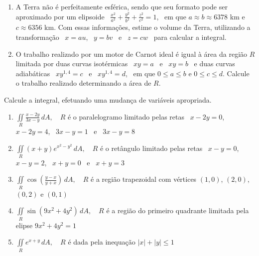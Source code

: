 \documentclass[a4paper, 12pt]{article}
\begin{document}
	\begin{enumerate}[resume]
		
		\item A Terra não é perfeitamente esférica, sendo que seu formato pode ser aproximado por um elipsoide \, $\displaystyle \frac{x^2}{a^2} + \frac{y^2}{b^2} + \frac{z^2}{c^2} = 1$, \, em que $a \approx b \approx 6378$ km e $c \approx 6356$ km. Com essas informações, estime o volume da Terra, utilizando a transformação \, $x = au$, \, $ y = bv$ \, e \, $z = cw$ \, para calcular a integral.
		
		\item O trabalho realizado por um motor de Carnot ideal é igual à área da região $R$ limitada por duas curvas isotérmicas \, $xy = a$ \, e \, $xy = b$ \, e duas curvas adiabáticas \, $xy^{1,4} = c$ \, e \, $xy^{1,4} = d$, \, em que $0 \leq a \leq b$ e $0 \leq c \leq d$. Calcule o trabalho realizado determinando a área de $R$.\\
		
	\end{enumerate}
	
	\vspace{5mm}
	
	Calcule a integral, efetuando uma mudança de variáveis apropriada.
	
	\begin{enumerate}[resume]
	
		\item $\displaystyle \iint \limits_R \frac{x - 2y}{3x - y} \, dA, \quad R$ é o paralelogramo limitado pelas retas \, $x - 2y = 0$, \, $x - 2y = 4$, \, $3x - y = 1$ \, e \, $3x - y = 8$
		
		\item $\displaystyle \iint \limits_R (x + y)e^{x^2 - y^2} \, dA, \quad R$ é o retângulo limitado pelas retas \, $x - y = 0$, \, $x - y = 2$, \, $ x + y = 0$ \, e \, $x + y = 3$
		
		\item $\displaystyle \iint \limits_R \cos \left(\frac{y-x}{y+x}\right) \, dA, \quad R$ é a região trapezoidal com vértices $(1,0)$, $(2,0)$, $(0,2)$ e $(0,1)$\\
		
		\item $\displaystyle \iint \limits_R \sin(9x^2 + 4y^2) \, dA, \quad R$ é a região do primeiro quadrante limitada pela elipse $9x^2 + 4y^2 = 1$
		
		\item $\displaystyle \iint \limits_R e^{x+y} \, dA, \quad R$ é dada pela inequação $|x| + |y| \leq 1$
	
	\end{enumerate}
		
	\vspace{5mm}	
	
\end{document}
